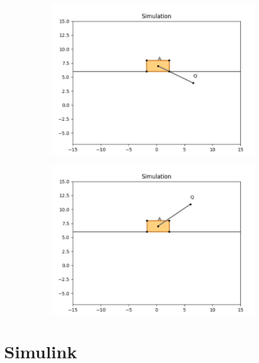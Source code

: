 \documentclass{article}
\begin{document}
\begin{figure}[htbp]
\begin{subfigure}[t]{0.45\linewidth}
    \includegraphics[width=\linewidth]{simulation/init3_3.png}
    \caption{}
  \end{subfigure}
  \begin{subfigure}[t]{0.45\linewidth}
    \centering
    \includegraphics[width=\linewidth]{simulation/init3_4.png}
    \caption{}
  \end{subfigure}
\end{figure}

\section{Simulink}
\end{document}
